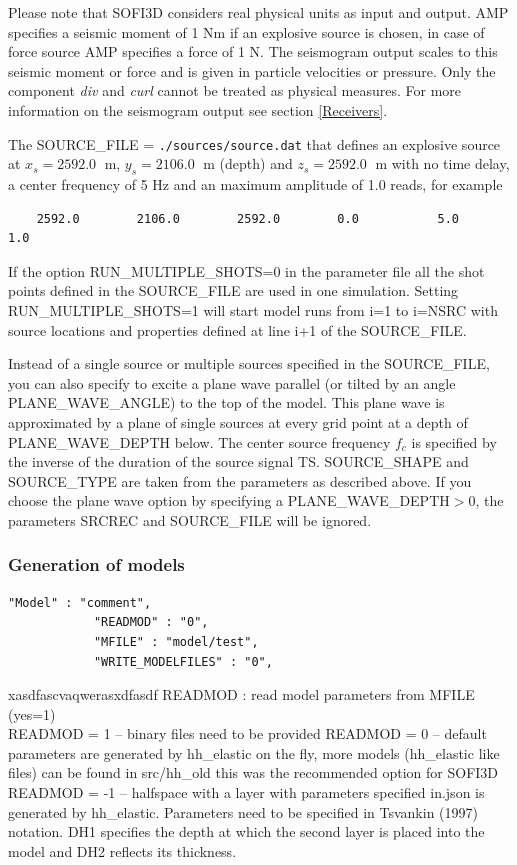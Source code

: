 \documentclass[11pt,onecolumn,oneside]{article}
\begin{document}
Please note that SOFI3D considers real physical units as input and output. AMP specifies a seismic moment of 1 Nm if an explosive source is chosen, in case of force source AMP specifies a force of 1 N. The seismogram output scales to this seismic moment or force and is given in particle velocities or pressure. Only the component \textit{div} and \textit{curl} cannot be treated as physical measures. For more information on the seismogram output see section \ref{Receivers}.

The  SOURCE\_FILE =  \lstinline{./sources/source.dat} that defines an explosive source  at $x_s=2592.0\;$ m, $y_s=2106.0\;$ m (depth) and $z_s=2592.0\;$ m  with no time delay,
a center frequency of 5 Hz  and an maximum amplitude of 1.0 reads, for example
\begin{verbatim}
    2592.0        2106.0        2592.0        0.0           5.0           1.0
\end{verbatim}

If the option RUN\_MULTIPLE\_SHOTS=0 in the parameter file all the shot points defined in the SOURCE\_FILE are used in one simulation. Setting RUN\_MULTIPLE\_SHOTS=1 will start model runs 
from i=1 to i=NSRC with source locations and properties defined at line i+1 of the SOURCE\_FILE. 

Instead of a single source or multiple sources specified in the SOURCE\_FILE, you can also specify to excite a plane wave parallel (or tilted by an angle PLANE\_WAVE\_ANGLE) to the top of the model. This plane wave is approximated by a plane of single sources at every grid point at a depth of PLANE\_WAVE\_DEPTH below. The center source frequency $f_c$ is specified by the inverse of the duration of the source signal TS. SOURCE\_SHAPE and SOURCE\_TYPE are taken from the parameters as described above. If you choose the plane wave option by specifying a PLANE\_WAVE\_DEPTH$>$0, the parameters SRCREC and SOURCE\_FILE will be ignored.

\subsubsection{Generation of models}
\label{gen_of_mod}
\begin{verbatim}
"Model" : "comment",
            "READMOD" : "0",
            "MFILE" : "model/test",
            "WRITE_MODELFILES" : "0",

\end{verbatim}
xasdfascvaqwerasxdfasdf
READMOD : read model parameters from MFILE (yes=1) \\
READMOD = 1 -- binary files need to be provided
READMOD = 0 -- default parameters are generated by hh\_elastic on the fly, more models (hh\_elastic like files) can be found in src/hh\_old 
this was the recommended option for SOFI3D\\
READMOD = -1 -- halfspace with a layer with parameters specified in.json is generated by hh\_elastic. Parameters need to be specified in Tsvankin (1997) notation. DH1 specifies the depth at which the second layer is placed into the model and DH2 reflects its thickness.
\end{document}
